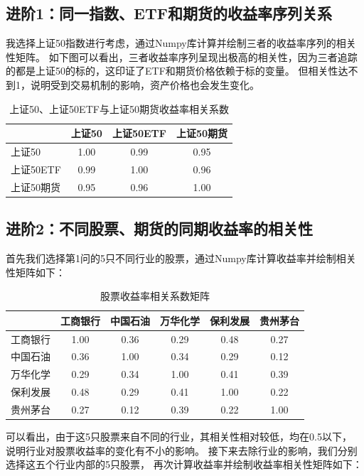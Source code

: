 \documentclass[a4paper,12pt]{article}
\begin{document}
\subsection{进阶1：同一指数、ETF和期货的收益率序列关系}

我选择上证50指数进行考虑，通过Numpy库计算并绘制三者的收益率序列的相关性矩阵。
如下图可以看出，三者收益率序列呈现出极高的相关性，因为三者追踪的都是上证50的标的，这印证了ETF和期货价格依赖于标的变量。
但相关性达不到1，说明受到交易机制的影响，资产价格也会发生变化。

\begin{table}[H]
\centering
\caption{上证50、上证50ETF与上证50期货收益率相关系数}
\begin{tabular}{lccc}
\toprule
 & 上证50 & 上证50ETF & 上证50期货 \\
\midrule
上证50      & 1.00 & 0.99 & 0.95 \\
上证50ETF   & 0.99 & 1.00 & 0.96 \\
上证50期货  & 0.95 & 0.96 & 1.00 \\
\bottomrule
\end{tabular}
\end{table}

\subsection{进阶2：不同股票、期货的同期收益率的相关性}

首先我们选择第1问的5只不同行业的股票，通过Numpy库计算收益率并绘制相关性矩阵如下：

\begin{table}[H]
\centering
\caption{股票收益率相关系数矩阵}
\begin{tabular}{lccccc}
\toprule
 & 工商银行 & 中国石油 & 万华化学 & 保利发展 & 贵州茅台 \\
\midrule
工商银行 & 1.00 & 0.36 & 0.29 & 0.48 & 0.27 \\
中国石油 & 0.36 & 1.00 & 0.34 & 0.29 & 0.12 \\
万华化学 & 0.29 & 0.34 & 1.00 & 0.41 & 0.39 \\
保利发展 & 0.48 & 0.29 & 0.41 & 1.00 & 0.22 \\
贵州茅台 & 0.27 & 0.12 & 0.39 & 0.22 & 1.00 \\
\bottomrule
\end{tabular}
\end{table}

可以看出，由于这5只股票来自不同的行业，其相关性相对较低，均在0.5以下，
说明行业对股票收益率的变化有不小的影响。
接下来去除行业的影响，我们分别选择这五个行业内部的5只股票，
再次计算收益率并绘制收益率相关性矩阵如下：
\end{document}
